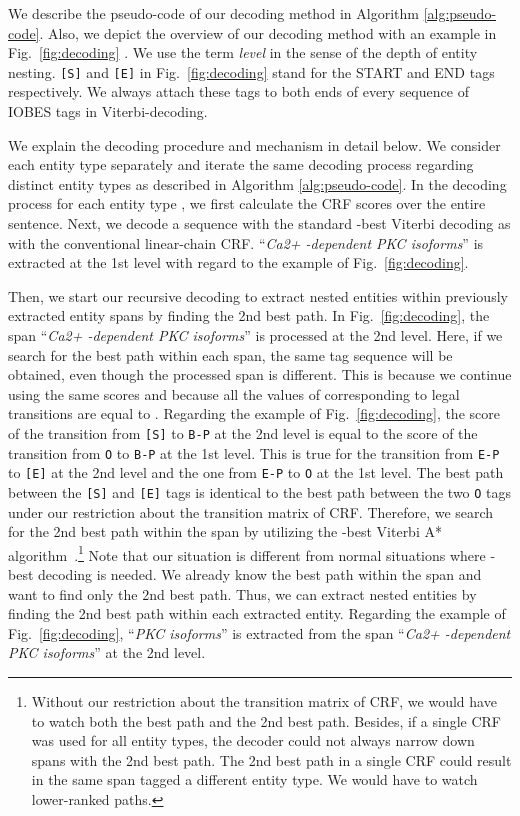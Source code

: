 \documentclass[11pt,a4paper]{article}
\def\figref#1{Fig.~\ref{#1}}
\begin{document}
We describe the pseudo-code of our decoding method in Algorithm \ref{alg:pseudo-code}.
Also, we depict the overview of our decoding method with an example in \figref{fig:decoding} .
We use the term {\it level} in the sense of the depth of entity nesting.
{\tt [S]} and {\tt [E]} in \figref{fig:decoding} stand for the START and END tags respectively. 
We always attach these tags to both ends of every sequence of IOBES tags in Viterbi-decoding.

We explain the decoding procedure and mechanism in detail below.
We consider each entity type separately and iterate the same decoding process regarding distinct entity types as described in Algorithm \ref{alg:pseudo-code}.
In the decoding process for each entity type , we first calculate the CRF scores  over the entire sentence.
Next, we decode a sequence with the standard -best Viterbi decoding as with the conventional linear-chain CRF.
``{\it Ca2+ -dependent PKC isoforms}'' is extracted at the 1st level with regard to the example of \figref{fig:decoding}.

Then, we start our recursive decoding to extract nested entities within previously extracted entity spans by finding the 2nd best path.
In \figref{fig:decoding}, the span ``{\it Ca2+ -dependent PKC isoforms}'' is processed at the 2nd level.
Here, if we search for the best path within each span, the same tag sequence will be obtained, even though the processed span is different.
This is because we continue using the same scores  and because all the values of  corresponding to legal transitions are equal to .
Regarding the example of \figref{fig:decoding}, the score of the transition from {\tt [S]} to {\tt B-P} at the 2nd level is equal to the score of the transition from {\tt O} to {\tt B-P} at the 1st level.
This is true for the transition from {\tt E-P} to {\tt [E]} at the 2nd level and the one from {\tt E-P} to {\tt O} at the 1st level.
The best path between the {\tt [S]} and {\tt [E]} tags is identical to the best path between the two {\tt O} tags under our restriction about the transition matrix of CRF.
Therefore, we search for the 2nd best path within the span by utilizing the -best Viterbi A* algorithm~\cite{Seshadri:1994,huang-etal-2012-iterative}.\footnote{Without our restriction about the transition matrix of CRF, we would have to watch both the best path and the 2nd best path. Besides, if a single CRF was used for all entity types, the decoder could not always narrow down spans with the 2nd best path. The 2nd best path in a single CRF could result in the same span tagged a different entity type. We would have to watch lower-ranked paths.}
Note that our situation is different from normal situations where -best decoding is needed.
We already know the best path within the span and want to find only the 2nd best path.
Thus, we can extract nested entities by finding the 2nd best path within each extracted entity.
Regarding the example of \figref{fig:decoding}, ``{\it PKC isoforms}'' is extracted from the span ``{\it Ca2+ -dependent PKC isoforms}'' at the 2nd level.
\end{document}
